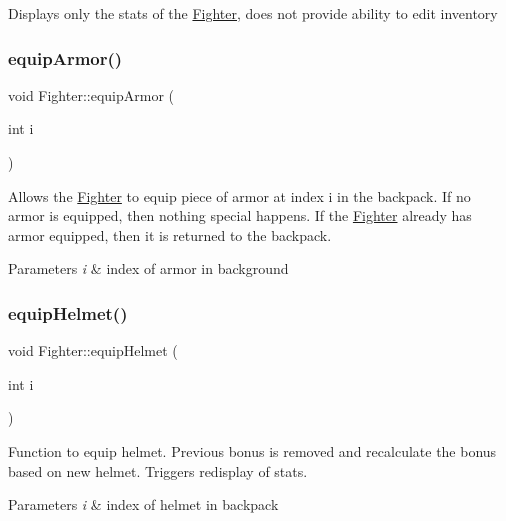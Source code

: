 Displays only the stats of the \hyperlink{class_fighter}{Fighter}, does not provide ability to edit inventory \hypertarget{class_fighter_acabd4955401ddf3ddc0be5f28fa64267}{}\label{class_fighter_acabd4955401ddf3ddc0be5f28fa64267} 
\subsubsection{\texorpdfstring{equip\+Armor()}{equipArmor()}}
{\footnotesize\ttfamily void Fighter\+::equip\+Armor (\begin{DoxyParamCaption}\item[{int}]{i }\end{DoxyParamCaption})}

Allows the \hyperlink{class_fighter}{Fighter} to equip piece of armor at index \textquotesingle{}i\textquotesingle{} in the backpack. If no armor is equipped, then nothing special happens. If the \hyperlink{class_fighter}{Fighter} already has armor equipped, then it is returned to the backpack. 
\begin{DoxyParams}{Parameters}
{\em i} & index of armor in background \\
\hline
\end{DoxyParams}
\hypertarget{class_fighter_ae90d7de8a4d6b61b35f43cefe7ec940c}{}\label{class_fighter_ae90d7de8a4d6b61b35f43cefe7ec940c} 
\subsubsection{\texorpdfstring{equip\+Helmet()}{equipHelmet()}}
{\footnotesize\ttfamily void Fighter\+::equip\+Helmet (\begin{DoxyParamCaption}\item[{int}]{i }\end{DoxyParamCaption})}

Function to equip helmet. Previous bonus is removed and recalculate the bonus based on new helmet. Triggers redisplay of stats. 
\begin{DoxyParams}{Parameters}
{\em i} & index of helmet in backpack \\
\hline
\end{DoxyParams}
\hypertarget{class_fighter_a4d88916d33514e2c7e5aaaef8916f93c}{}\label{class_fighter_a4d88916d33514e2c7e5aaaef8916f93c} 
